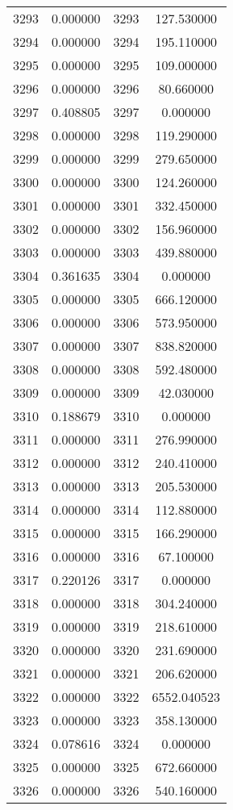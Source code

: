 \documentclass[12pt]{article}
\begin{document}
\begin{longtable}{@{}cccc@{}}
3293 & 0.000000 & 3293 & 127.530000 \\
3294 & 0.000000 & 3294 & 195.110000 \\
3295 & 0.000000 & 3295 & 109.000000 \\
3296 & 0.000000 & 3296 & 80.660000 \\
3297 & 0.408805 & 3297 & 0.000000 \\
3298 & 0.000000 & 3298 & 119.290000 \\
3299 & 0.000000 & 3299 & 279.650000 \\
3300 & 0.000000 & 3300 & 124.260000 \\
3301 & 0.000000 & 3301 & 332.450000 \\
3302 & 0.000000 & 3302 & 156.960000 \\
3303 & 0.000000 & 3303 & 439.880000 \\
3304 & 0.361635 & 3304 & 0.000000 \\
3305 & 0.000000 & 3305 & 666.120000 \\
3306 & 0.000000 & 3306 & 573.950000 \\
3307 & 0.000000 & 3307 & 838.820000 \\
3308 & 0.000000 & 3308 & 592.480000 \\
3309 & 0.000000 & 3309 & 42.030000 \\
3310 & 0.188679 & 3310 & 0.000000 \\
3311 & 0.000000 & 3311 & 276.990000 \\
3312 & 0.000000 & 3312 & 240.410000 \\
3313 & 0.000000 & 3313 & 205.530000 \\
3314 & 0.000000 & 3314 & 112.880000 \\
3315 & 0.000000 & 3315 & 166.290000 \\
3316 & 0.000000 & 3316 & 67.100000 \\
3317 & 0.220126 & 3317 & 0.000000 \\
3318 & 0.000000 & 3318 & 304.240000 \\
3319 & 0.000000 & 3319 & 218.610000 \\
3320 & 0.000000 & 3320 & 231.690000 \\
3321 & 0.000000 & 3321 & 206.620000 \\
3322 & 0.000000 & 3322 & 6552.040523 \\
3323 & 0.000000 & 3323 & 358.130000 \\
3324 & 0.078616 & 3324 & 0.000000 \\
3325 & 0.000000 & 3325 & 672.660000 \\
3326 & 0.000000 & 3326 & 540.160000 \\

\end{longtable}
\end{document}
